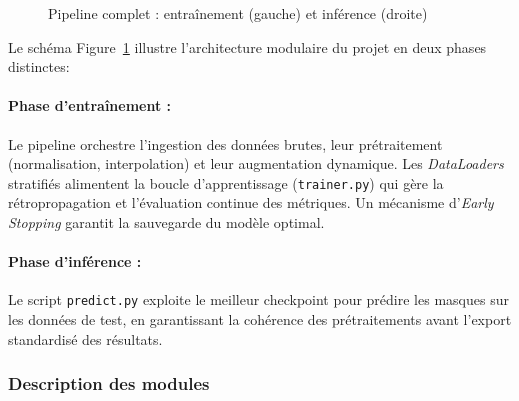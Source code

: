 \begin{figure}[H]
      \caption{Pipeline complet : entraînement (gauche) et inférence (droite)}
      \label{fig:architecture}
\end{figure}

Le schéma Figure~\ref{fig:architecture} illustre l'architecture modulaire du projet en deux phases distinctes:

\paragraph{Phase d'entraînement :}
Le pipeline orchestre l'ingestion des données brutes, leur prétraitement (normalisation, interpolation) et leur augmentation dynamique. Les \textit{DataLoaders} stratifiés alimentent la boucle d'apprentissage (\texttt{trainer.py}) qui gère la rétropropagation et l'évaluation continue des métriques. Un mécanisme d'\textit{Early Stopping} garantit la sauvegarde du modèle optimal.

\paragraph{Phase d'inférence :}
Le script \texttt{predict.py} exploite le meilleur checkpoint pour prédire les masques sur les données de test, en garantissant la cohérence des prétraitements avant l'export standardisé des résultats.

\subsubsection{Description des modules}


